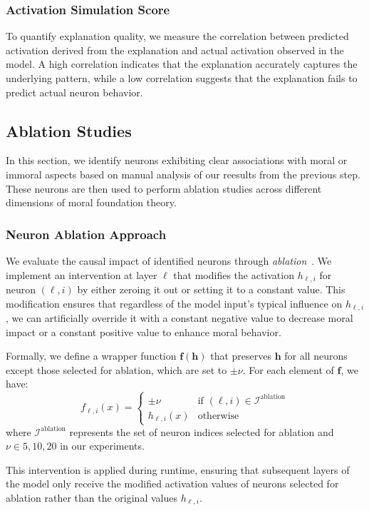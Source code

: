 \documentclass[runninghheads]{llncs}
\begin{document}
\subsubsection{Activation Simulation Score} 
To quantify explanation quality, we measure the correlation between predicted activation derived from the explanation and actual activation observed in the model. A high correlation indicates that the explanation accurately captures the underlying pattern, while a low correlation suggests that the explanation fails to predict actual neuron behavior.


\subsection{Ablation Studies}
In this section, we identify neurons exhibiting clear associations with moral or immoral aspects based on manual analysis of our reesults from the previous step. These neurons are then used to perform ablation studies across different dimensions of moral foundation theory.



\subsubsection{Neuron Ablation Approach}

We evaluate the causal impact of identified neurons through \emph{ablation}~\cite{Morcos2018,Wang2022}.
We implement an intervention at layer $\ell$ that modifies the activation $h_{\ell,i}$ for neuron $(\ell,i)$ by either zeroing it out or setting it to a constant value.
This modification ensures that regardless of the model input's typical influence on $h_{\ell,i}$, we can artificially override it with a constant negative value to decrease moral impact or a constant positive value to enhance moral behavior.

Formally, we define a wrapper function $\mathbf{f(h)}$ that preserves $\mathbf{h}$ for all neurons except those selected for ablation, which are set to $\pm \nu$. For each element of $\mathbf{f}$, we have:
$$
f_{\ell,i}(x) = \begin{cases} \pm \nu & \text{if } (\ell,i) \in \mathcal{I}^\text{ablation} \\ h_{\ell,i}(x) & \text{otherwise} \end{cases}
$$
where $\mathcal{I}^\text{ablation}$ represents the set of neuron indices selected for ablation and $\nu \in {5,10,20}$ in our experiments.

This intervention is applied during runtime, ensuring that subsequent layers of the model only receive the modified activation values of neurons selected for ablation rather than the original values $h_{\ell,i}$.
\end{document}

